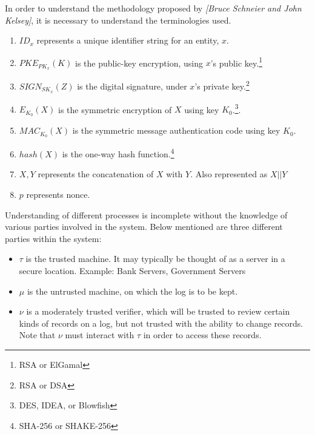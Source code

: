\documentclass[12pt, letter]{article}
\newcommand\paperAuthors[2]{[#1 and #2]}
\newcommand\makePaperAuthors{\paperAuthors{Bruce Schneier}{John Kelsey}}
\begin{document}
In order to understand the methodology proposed by \textit{\makePaperAuthors}, it is necessary to understand the terminologies used.
\renewcommand{\labelenumi}{(\roman{enumi})}
\begin{enumerate}
    \item $ID_x$ represents a unique identifier string for an entity, $x$. 
    
    \item $PKE_{PK_x} (K)$ is the public-key encryption, using $x$’s public key.\footnote{RSA or ElGamal}

    \item $SIGN_{SK_x}(Z)$ is the digital signature, under $x$’s private key.\footnote{RSA or DSA}

    \item $E_{K_0}(X)$ is the symmetric encryption of $X$ using key $K_0$.\footnote{DES, IDEA, or Blowfish}. 

    \item $MAC_{K_0}(X)$ is the symmetric message authentication code using key $K_0$. 

    \item $hash(X)$ is the one-way hash function.\footnote{SHA-256 or SHAKE-256}

    \item $X, Y$ represents the concatenation of $X$ with $Y$. Also represented as $X || Y$

    \item $p$ represents nonce.
\end{enumerate}

Understanding of different processes is incomplete without the knowledge of various parties involved in the system. Below mentioned are three different parties within the system:

\begin{itemize}
    \item $\tau$ is the trusted machine. It may typically be thought of as a server in a secure location. Example: Bank Servers, Government Servers
    
    \item $\mu$ is the untrusted machine, on which the log is to be kept.
    
    \item $\nu$ is a moderately trusted verifier, which will be trusted to review certain kinds of records on a log, but not trusted with the ability to change records. Note that $\nu$ must interact with $\tau$ in order to access these records. 
\end{itemize}
\end{document}
